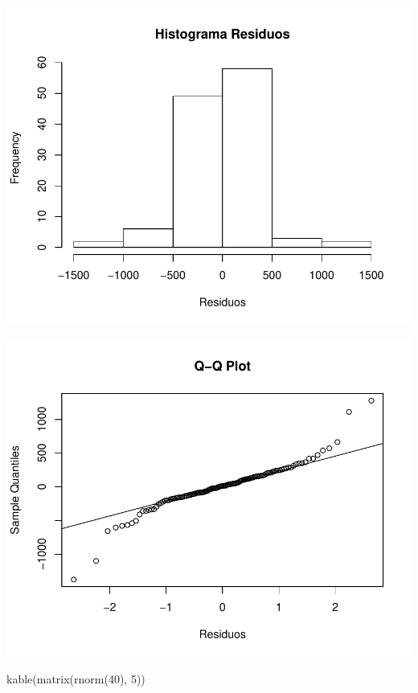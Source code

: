 \documentclass[11pt,a4paper,oneside]{article}\usepackage[]{graphicx}\usepackage[]{color}
\makeatletter
\def\maxwidth{ %
  \ifdim\Gin@nat@width>\linewidth
    \linewidth
  \else
    \Gin@nat@width
  \fi
}
\newenvironment{knitrout}{}{} %
\makeatother
\begin{document}
\begin{knitrout}
{\centering \includegraphics[width=\maxwidth]{figure/unnamed-chunk-16-71} 

}




{\centering \includegraphics[width=\maxwidth]{figure/unnamed-chunk-16-72} 

}



\end{knitrout}

kable(matrix(rnorm(40), 5))
\end{document}
